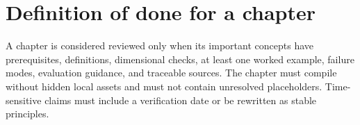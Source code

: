\section{Definition of done for a chapter}

A chapter is considered reviewed only when its important concepts have
prerequisites, definitions, dimensional checks, at least one worked example,
failure modes, evaluation guidance, and traceable sources.
The chapter must compile without hidden local assets and must not contain
unresolved placeholders.
Time-sensitive claims must include a verification date or be rewritten as
stable principles.
